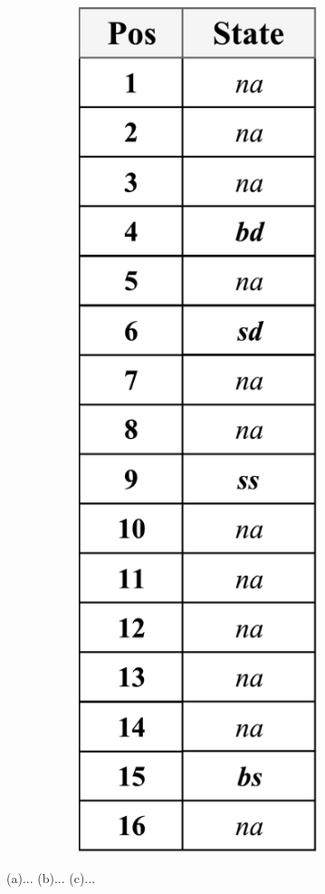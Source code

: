 \documentclass[]{interact}
\theoremstyle{plain}%
\theoremstyle{definition}
\theoremstyle{remark}
\begin{document}
\begin{figure}[]
\begin{subfigure}[b]{0.48\textwidth}
\begin{subfigure}[b]{.2\textwidth}
			\includegraphics[width=\textwidth]{./figs/table_presence.pdf}
		\end{subfigure}
	\caption{}
	\label{phantom:2}
	\end{subfigure}
	\caption{(a)... (b)... (c)... }
	\label{phantom}
\end{figure}
\end{document}
